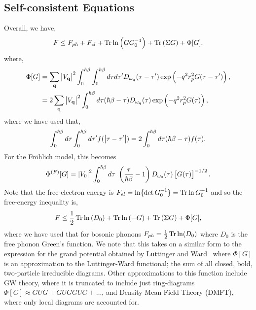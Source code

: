 \subsection{Self-consistent Equations}

Overall, we have,
\begin{equation}
    F \leq F_{ph} + F_{el} + \Tr \ln \left(G G_0^{-1}\right)   + \Tr \left( \Sigma G \right) + \Phi[G],
\end{equation}
where, 
\begin{equation}
    \begin{aligned}
        \Phi[G] &= \sum_{\vb{q}} \abs{V_{\vb{q}}}^2 \int_{0}^{\hbar\beta} \int_0^{\hbar\beta} d\tau d\tau' D_{\omega_{\vb{q}}}(\tau - \tau') \exp \left( -q^2 r_p^2 G(\tau - \tau') \right) ,\\
        &= 2 \sum_{\vb{q}} \abs{V_{\vb{q}}}^2 \int_0^{\hbar\beta}  d\tau (\hbar \beta - \tau) D_{\omega_{\vb{q}}} (\tau) \exp\left(-q^2 r_p^2 G(\tau)\right),
    \end{aligned}
\end{equation}
where we have used that,
\begin{equation}
    \int_0^{\hbar\beta} d\tau \int_0^{\hbar\beta} d\tau' f(\abs{\tau - \tau'}) = 2 \int_0^{\hbar\beta} d\tau (\hbar\beta - \tau) f(\tau).
\end{equation}
For the Fr\"ohlich model, this becomes
\begin{equation}
    \Phi^{(F)}[G] = \abs{V_0}^2 \int^{\hbar\beta}_0 d\tau\ \left(\frac{\tau}{\hbar\beta} - 1 \right) D_{\omega_0}(\tau) \left[G(\tau)\right]^{-1/2} .
\end{equation}
Note that the free-electron energy is $F_{el} = \ln\{\det G_0^{-1}\} = \Tr \ln G_0^{-1}$ and so the free-energy inequality is,
\begin{equation} \label{eqn:scfreeenergy}
    F \leq \frac{1}{2} \Tr \ln \left( D_0 \right) + \Tr \ln \left(-G\right) + \Tr\left(\Sigma G\right) + \Phi[G],
\end{equation}
where we have used that for bosonic phonons $F_{ph} = \frac{1}{2} \Tr \ln (D_0)$ where $D_0$ is the free phonon Green's function. We note that this takes on a similar form to the expression for the grand potential obtained by Luttinger and Ward~\cite{luttinger_ground-state_1960} where $\Phi[G]$ is an approximation to the Luttinger-Ward functional; the sum of all closed, bold, two-particle irreducible diagrams. Other approximations to this function include GW theory, where it is truncated to include just ring-diagrams $\Phi[G] \approx GUG + GUGGUG + \dots$, and Density Mean-Field Theory (DMFT), where only local diagrams are accounted for.

